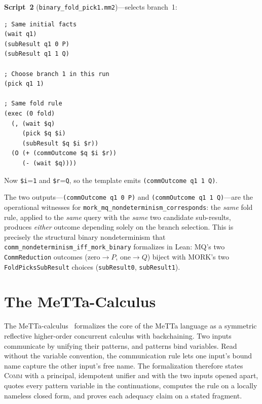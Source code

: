\documentclass[11pt]{article}
\theoremstyle{definition}
\theoremstyle{remark}
\begin{document}
\smallskip\noindent
\textbf{Script~2} (\texttt{binary\_fold\_pick1.mm2})---selects branch~1:

\begin{lstlisting}[caption={Pick outcome 1 (from \texttt{binary\_fold\_pick1.mm2})}]
; Same initial facts
(wait q1)
(subResult q1 0 P)
(subResult q1 1 Q)

; Choose branch 1 in this run
(pick q1 1)

; Same fold rule
(exec (0 fold)
  (, (wait $q)
     (pick $q $i)
     (subResult $q $i $r))
  (O (+ (commOutcome $q $i $r))
     (- (wait $q))))
\end{lstlisting}

\noindent
Now \texttt{\$i}=\texttt{1} and \texttt{\$r}=\texttt{Q}, so
the template emits \texttt{(commOutcome q1 1 Q)}.

\noindent
The two outputs---\texttt{(commOutcome q1 0 P)} and
\texttt{(commOutcome q1 1 Q)}---are the operational witnesses for
\texttt{mork\_mq\_nondeterminism\_corresponds}: the \emph{same}
fold rule, applied to the \emph{same} query with the \emph{same}
two candidate sub-results, produces \emph{either} outcome depending
solely on the branch selection.  This is precisely the structural
binary nondeterminism that \texttt{comm\_nondeterminism\_iff\_mork\_binary}
formalizes in Lean: MQ's two \texttt{CommReduction} outcomes (zero$\to P$,
one$\to Q$) biject with MORK's two \texttt{FoldPicksSubResult} choices
(\texttt{subResult0}, \texttt{subResult1}).


\section{The MeTTa-Calculus}
\label{sec:metta-calc}

The MeTTa-calculus~\cite{MeredithMeTTaCalculus2024} formalizes the core
of the MeTTa language as a symmetric reflective higher-order concurrent
calculus with backchaining.  Two inputs communicate by unifying their
patterns, and patterns bind variables.  Read without the variable
convention, the communication rule lets one input's bound name capture the
other input's free name.  The formalization therefore states
\textsc{Comm} with a principal, idempotent unifier and with the two inputs
opened apart, quotes every pattern variable in the continuations, computes
the rule on a locally nameless closed form, and proves each adequacy claim
on a stated fragment.
\end{document}
